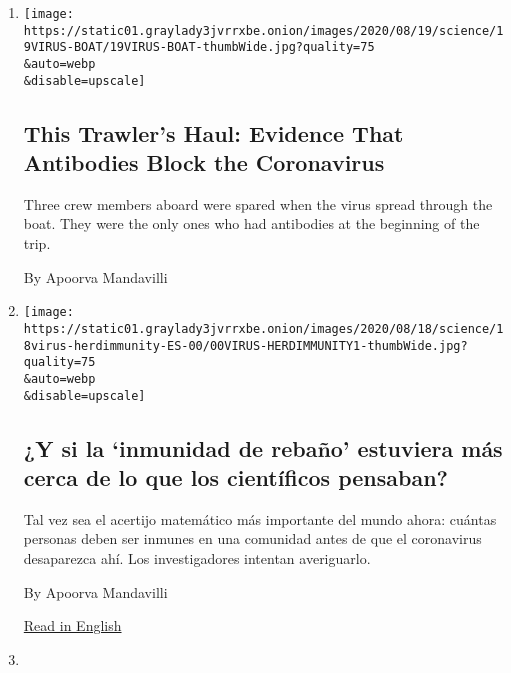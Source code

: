 \begin{enumerate}
\def\labelenumi{\arabic{enumi}.}
\item
  \href{/2020/08/19/health/coronavirus-fishing-boat.html}{}

  \texttt{[image: https://static01.graylady3jvrrxbe.onion/images/2020/08/19/science/19VIRUS-BOAT/19VIRUS-BOAT-thumbWide.jpg?quality=75\\\&auto=webp\\\&disable=upscale]}

  \hypertarget{this-trawlers-haul-evidence-that-antibodies-block-the-coronavirus}{%
  \subsection{This Trawler's Haul: Evidence That Antibodies Block the
  Coronavirus}\label{this-trawlers-haul-evidence-that-antibodies-block-the-coronavirus}}

  Three crew members aboard were spared when the virus spread through
  the boat. They were the only ones who had antibodies at the beginning
  of the trip.

  By Apoorva Mandavilli
\item
  \href{/es/2020/08/18/espanol/ciencia-y-tecnologia/inmunidad-rebano-coronavirus.html}{}

  \texttt{[image: https://static01.graylady3jvrrxbe.onion/images/2020/08/18/science/18virus-herdimmunity-ES-00/00VIRUS-HERDIMMUNITY1-thumbWide.jpg?quality=75\\\&auto=webp\\\&disable=upscale]}

  \hypertarget{y-si-la-inmunidad-de-rebauxf1o-estuviera-muxe1s-cerca-de-lo-que-los-cientuxedficos-pensaban}{%
  \subsection{¿Y si la `inmunidad de rebaño' estuviera más cerca de lo
  que los científicos
  pensaban?}\label{y-si-la-inmunidad-de-rebauxf1o-estuviera-muxe1s-cerca-de-lo-que-los-cientuxedficos-pensaban}}

  Tal vez sea el acertijo matemático más importante del mundo ahora:
  cuántas personas deben ser inmunes en una comunidad antes de que el
  coronavirus desaparezca ahí. Los investigadores intentan averiguarlo.

  By Apoorva Mandavilli

  \href{https://www.nytimes3xbfgragh.onion/2020/08/17/health/coronavirus-herd-immunity.html}{Read
  in English}
\item
  \href{/2020/08/17/health/coronavirus-herd-immunity.html}{}


\end{enumerate}
